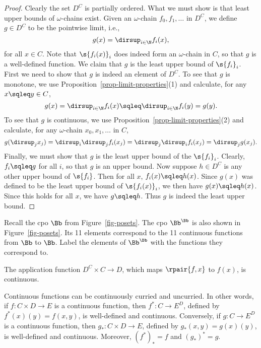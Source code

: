 \documentclass[12pt]{article}
\begin{document}
\begin{proof}
  Clearly the set $D^C$ is partially ordered. What we must show is
  that least upper bounds of $\omega$-chains exist.  Given an
  $\omega$-chain $f_0,f_1,\ldots$ in $D^C$, we define $g\in D^C$
  to be the pointwise limit, i.e.,
  \[               g(x) = \dirsup_{i\in\N}f_i(x),
  \]
  for all $x\in C$. Note that $\s{f_i(x)}_i$ does indeed form an
  $\omega$-chain in $C$, so that $g$ is a well-defined function. We
  claim that $g$ is the least upper bound of $\s{f_i}_i$. First we
  need to show that $g$ is indeed an element of $D^C$. To see that $g$
  is monotone, we use Proposition~\ref{prop-limit-properties}(1) and
  calculate, for any $x\sqleq y\in C$,
  \[   g(x) = \dirsup_{i\in\N}f_i(x) \sqleq \dirsup_{i\in\N}f_i(y)
  = g(y). \] To see that $g$ is continuous, we use
  Proposition~\ref{prop-limit-properties}(2) and calculate, for any
  $\omega$-chain $x_0,x_1,\ldots$ in $C$,
  \[   g(\dirsup_j x_j) = \dirsup_i \dirsup_j f_i(x_j) 
  = \dirsup_j \dirsup_i f_i(x_j) = \dirsup_j g(x_j).
  \]
  Finally, we must show that $g$ is the least upper bound of the
  $\s{f_i}_i$. Clearly, $f_i\sqleq g$ for all $i$, so that $g$ is an
  upper bound. Now suppose $h\in D^C$ is any other upper bound of
  $\s{f_i}$. Then for all $x$, $f_i(x)\sqleq h(x)$. Since $g(x)$ was
  defined to be the least upper bound of $\s{f_i(x)}_i$, we then have
  $g(x)\sqleq h(x)$. Since this holds for all $x$, we have $g\sqleq
  h$. Thus $g$ is indeed the least upper bound.\eot
\end{proof}

\begin{exercise}
  Recall the cpo $\Bb$ from Figure~\ref{fig-posets}.  The cpo
  $\Bb^{\Bb}$ is also shown in Figure~\ref{fig-posets}. Its 11
  elements correspond to the 11 continuous functions from $\Bb$ to
  $\Bb$. Label the elements of $\Bb^{\Bb}$ with the functions they
  correspond to.
\end{exercise}

\begin{proposition}\label{prop-cpo-app}
  The application function $D^C\times C\to D$, which maps
  $\rpair{f,x}$ to $f(x)$, is continuous.
\end{proposition}

\begin{proposition}\label{prop-cpo-curry}
  Continuous functions can be continuously curried and uncurried. In
  other words, if $f:C\times D\to E$ is a continuous function, then
  $f^*:C\to E^D$, defined by $f^*(x)(y) = f(x,y)$, is well-defined and
  continuous. Conversely, if $g:C\to E^D$ is a continuous function, then
  $g_*:C\times D\to E$, defined by $g_*(x,y) = g(x)(y)$, is well-defined
  and continuous. Moreover, $(f^*)_*=f$ and $(g_*)^*=g$. 
\end{proposition}
\end{document}

